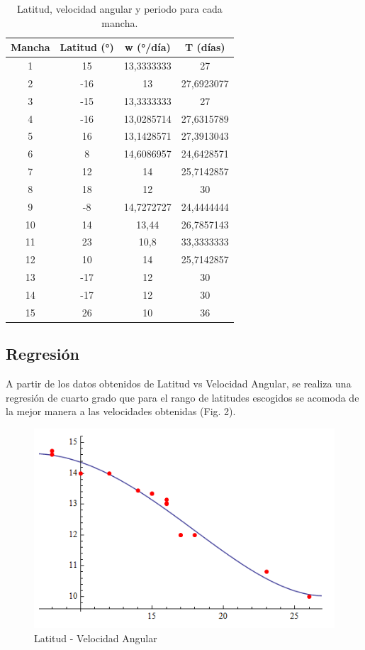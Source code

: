 \documentclass[11pt,letterpaper]{article}
\begin{document}
\begin{table}[htbp]
  \centering
	\begin{tabular}{cccc}
	\toprule
	    Mancha &  Latitud (°) & w (°/día) &   T (días) \\
	\midrule
	         1 &         15 & 13,3333333 &         27 \\
	         2 &        -16 &         13 & 27,6923077 \\
	         3 &        -15 & 13,3333333 &         27 \\
	         4 &        -16 & 13,0285714 & 27,6315789 \\
	         5 &         16 & 13,1428571 & 27,3913043 \\
	         6 &          8 & 14,6086957 & 24,6428571 \\
	         7 &         12 &         14 & 25,7142857 \\
	         8 &         18 &         12 &         30 \\
	         9 &         -8 & 14,7272727 & 24,4444444 \\
	        10 &         14 &      13,44 & 26,7857143 \\
	        11 &         23 &       10,8 & 33,3333333 \\
	        12 &         10 &         14 & 25,7142857 \\
	        13 &        -17 &         12 &         30 \\
	        14 &        -17 &         12 &         30 \\
	        15 &         26 &         10 &         36 \\
	\bottomrule
	\end{tabular} 
	\caption{Latitud, velocidad angular y periodo para cada mancha.}%

\end{table}%

\subsection{Regresión}

A partir de los datos obtenidos de Latitud vs Velocidad Angular, se realiza una regresión de cuarto grado que para el rango de latitudes escogidos se acomoda de la mejor manera a las velocidades obtenidas (Fig. 2).
\\

\begin{figure}[h]
 \centering
 \includegraphics[width=0.522\linewidth]{./latw}
 \caption{Latitud - Velocidad Angular}
 \label{fig:latw}
 \end{figure}
 
\end{document}
